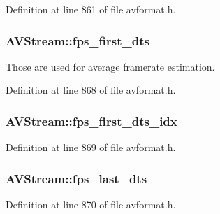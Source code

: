 Definition at line 861 of file avformat.\+h.

\subsubsection[{\texorpdfstring{fps\+\_\+first\+\_\+dts}{fps_first_dts}}]{ A\+V\+Stream\+::fps\+\_\+first\+\_\+dts}\hypertarget{struct_a_v_stream_a00f9cfd6b94390286360f004af7882a3}{}\label{struct_a_v_stream_a00f9cfd6b94390286360f004af7882a3}
Those are used for average framerate estimation. 

Definition at line 868 of file avformat.\+h.

\subsubsection[{\texorpdfstring{fps\+\_\+first\+\_\+dts\+\_\+idx}{fps_first_dts_idx}}]{ A\+V\+Stream\+::fps\+\_\+first\+\_\+dts\+\_\+idx}\hypertarget{struct_a_v_stream_a7c3c240bfa2e64162c3811ffc33207ff}{}\label{struct_a_v_stream_a7c3c240bfa2e64162c3811ffc33207ff}


Definition at line 869 of file avformat.\+h.

\subsubsection[{\texorpdfstring{fps\+\_\+last\+\_\+dts}{fps_last_dts}}]{ A\+V\+Stream\+::fps\+\_\+last\+\_\+dts}\hypertarget{struct_a_v_stream_a4ec56efe4892728d0b767d55c1238faa}{}\label{struct_a_v_stream_a4ec56efe4892728d0b767d55c1238faa}


Definition at line 870 of file avformat.\+h.

